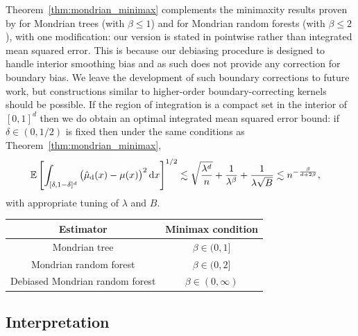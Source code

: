 Theorem~\ref{thm:mondrian_minimax} complements the minimaxity results
proven by \citet{mourtada2020minimax} for
Mondrian trees (with $\beta \leq 1$) and for Mondrian random forests
(with $\beta \leq 2$), with one modification:
our version is stated in pointwise rather than integrated
mean squared error.
This is because our debiasing procedure is designed to handle
interior smoothing bias and as such does not provide any correction
for boundary bias.
We leave the development of such boundary corrections to future work,
but constructions similar to higher-order boundary-correcting
kernels should be possible.
If the region of integration is a compact set
in the interior of $[0,1]^d$
then we do obtain an optimal integrated mean squared error bound:
if $\delta \in (0, 1/2)$ is fixed then under the
same conditions as Theorem~\ref{thm:mondrian_minimax},
%
\begin{align*}
  \mathbb{E} \left[
    \int_{[\delta, 1-\delta]^d}
    \big(
      \hat \mu_{\mathrm{d}}(x)
      - \mu(x)
    \big)^2
    \,\mathrm{d}x
  \right]^{1/2}
  &\lesssim
  \sqrt{\frac{\lambda^d}{n}}
  + \frac{1}{\lambda^\beta}
  + \frac{1}{\lambda \sqrt B}
  \lesssim
  n^{-\frac{\beta}{d + 2 \beta}},
\end{align*}
%
with appropriate tuning of $\lambda$ and $B$.


\begin{table}
  \begin{center}
    \begin{tabular}{|c|c|}
      \hline
      \textbf{Estimator} & \textbf{Minimax condition} \\
      \hline
      Mondrian tree &
      $\beta \in (0, 1]$ \\
      Mondrian random forest &
      $\beta \in (0, 2]$ \\
      Debiased Mondrian random forest &
      \hspace*{2mm}$\beta \in (0, \infty)$ \\
      \hline
    \end{tabular}
  \end{center}
\end{table}

\subsection{Interpretation}

